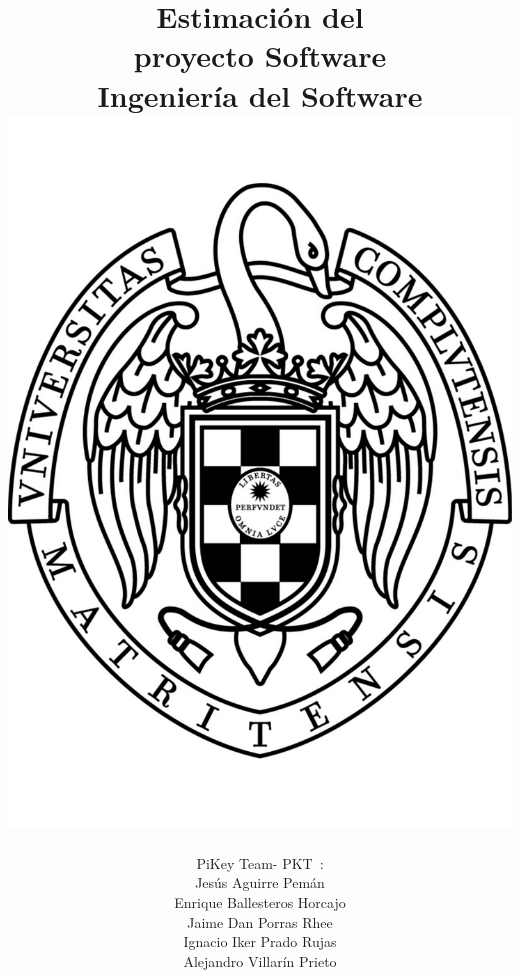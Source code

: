 \documentclass[spanish,a4paper,11pt, twoside]{report}	%
\newcommand*{\PKT}{\hbox{P}\kern-2.5pt\lower3.5pt\hbox{\small{K}}\kern-2.8pt\hbox{T}\kern-2pt}	%
\begin{document}
\title{\textbf{\huge{ Estimación del \\ 
	proyecto Software}} \\ \vspace{0.3cm}
	\Large{Ingeniería del Software} \\
	\includegraphics[scale=0.3]{ucm.pdf}}
\author{ {\Large{PiKey Team-}} \PKT \ : \vspace{0.2cm} \\
	Jesús Aguirre Pemán \\
	 Enrique Ballesteros Horcajo \\
	 Jaime Dan Porras Rhee \\
	 Ignacio Iker Prado Rujas \\
	 Alejandro Villarín Prieto }
\date{\Today}
\maketitle
\end{document}

